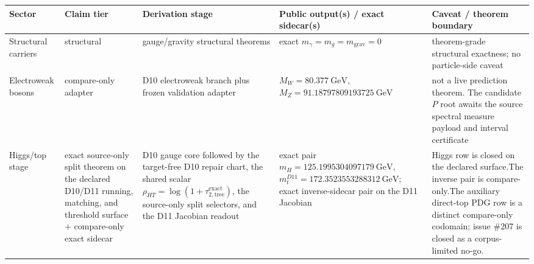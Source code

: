 \documentclass[11pt]{article}
\begin{document}
\begin{table}[h]
\centering
\tiny
\setlength{\tabcolsep}{2pt}
\begin{tabular}{@{}>{\raggedright\arraybackslash}p{}>{\raggedright\arraybackslash}p{}>{\raggedright\arraybackslash}p{}>{\raggedright\arraybackslash}p{}>{\raggedright\arraybackslash}p{}@{}}
\toprule
Sector & Claim tier & Derivation stage & Public output(s) / exact sidecar(s) & Caveat / theorem boundary \\
\midrule
Structural carriers & structural & gauge/gravity structural theorems & exact \(m_\gamma=m_g=m_{\mathrm{grav}}=0\) & theorem-grade structural exactness; no particle-side caveat \\
Electroweak bosons & compare-only adapter & D10 electroweak branch plus frozen validation adapter & \(M_W=80.377~\mathrm{GeV}\), \(M_Z=91.18797809193725~\mathrm{GeV}\) & not a live prediction theorem. The candidate \(P\) root awaits the source spectral measure payload and interval certificate \\
Higgs/top stage & exact source-only split theorem on the declared D10/D11 running, matching, and threshold surface + compare-only exact sidecar & D10 gauge core followed by the target-free D10 repair chart, the shared scalar \(\rho_{HT}=\log(1+\tau_{2,\mathrm{tree}}^{\mathrm{exact}})\), the source-only split selectors, and the D11 Jacobian readout & exact pair \(m_H=125.1995304097179~\mathrm{GeV}\), \(m_t^{D11}=172.3523553288312~\mathrm{GeV}\); exact inverse-sidecar pair on the D11 Jacobian & Higgs row is closed on the declared surface.\newline The inverse pair is compare-only.\newline The auxiliary direct-top PDG row is a distinct compare-only codomain; issue \#207 is closed as a corpus-limited no-go. \\

\end{tabular}
\end{table}
\end{document}
